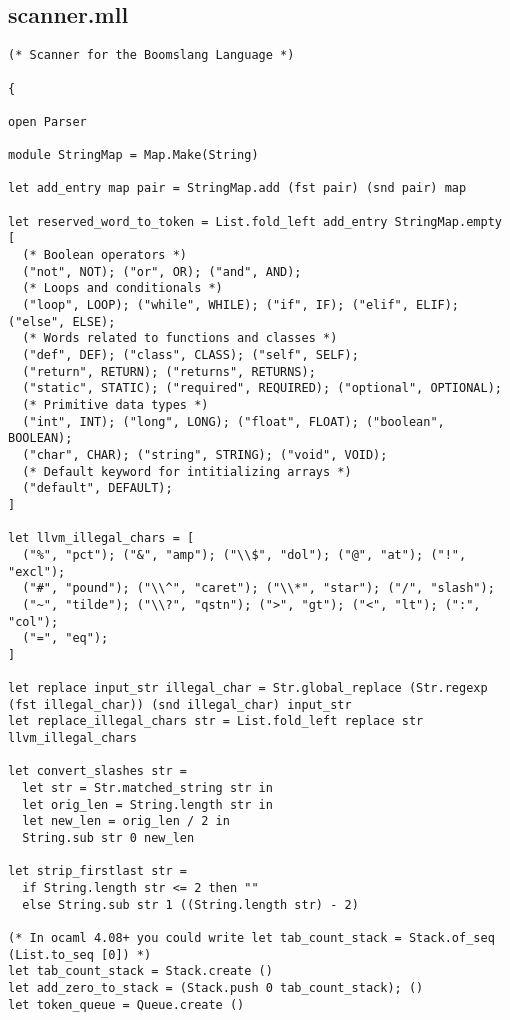 \documentclass{article}
\begin{document}
\subsection{scanner.mll} 
\begin{verbatim}
(* Scanner for the Boomslang Language *)

{

open Parser 

module StringMap = Map.Make(String)

let add_entry map pair = StringMap.add (fst pair) (snd pair) map

let reserved_word_to_token = List.fold_left add_entry StringMap.empty [
  (* Boolean operators *)
  ("not", NOT); ("or", OR); ("and", AND);
  (* Loops and conditionals *)
  ("loop", LOOP); ("while", WHILE); ("if", IF); ("elif", ELIF); ("else", ELSE);
  (* Words related to functions and classes *)
  ("def", DEF); ("class", CLASS); ("self", SELF);
  ("return", RETURN); ("returns", RETURNS);
  ("static", STATIC); ("required", REQUIRED); ("optional", OPTIONAL);
  (* Primitive data types *)
  ("int", INT); ("long", LONG); ("float", FLOAT); ("boolean", BOOLEAN);
  ("char", CHAR); ("string", STRING); ("void", VOID);
  (* Default keyword for intitializing arrays *)
  ("default", DEFAULT);
]

let llvm_illegal_chars = [
  ("%", "pct"); ("&", "amp"); ("\\$", "dol"); ("@", "at"); ("!", "excl");
  ("#", "pound"); ("\\^", "caret"); ("\\*", "star"); ("/", "slash");
  ("~", "tilde"); ("\\?", "qstn"); (">", "gt"); ("<", "lt"); (":", "col");
  ("=", "eq");
]

let replace input_str illegal_char = Str.global_replace (Str.regexp (fst illegal_char)) (snd illegal_char) input_str
let replace_illegal_chars str = List.fold_left replace str llvm_illegal_chars

let convert_slashes str = 
  let str = Str.matched_string str in
  let orig_len = String.length str in
  let new_len = orig_len / 2 in
  String.sub str 0 new_len

let strip_firstlast str =
  if String.length str <= 2 then ""
  else String.sub str 1 ((String.length str) - 2)

(* In ocaml 4.08+ you could write let tab_count_stack = Stack.of_seq (List.to_seq [0]) *)
let tab_count_stack = Stack.create ()
let add_zero_to_stack = (Stack.push 0 tab_count_stack); ()
let token_queue = Queue.create ()


\end{verbatim}
\end{document}
